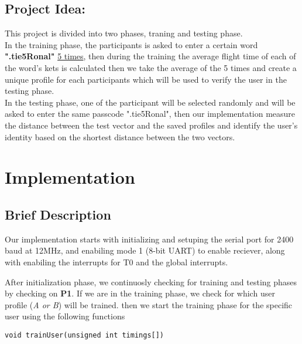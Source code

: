 \documentclass[runningheads]{llncs}
\begin{document}
\subsection{Project Idea:} 
This project is divided into two phases, traning and testing phase. \\

In the training phase, the participants is asked to enter a certain word \textbf{".tie5Ronal"} \underline{5 times}, then during the training the average flight time of each of the word's kets is calculated then we take the average of the 5 times and create a unique profile for each participants which will be used to verify the user in the testing phase. \\

In the testing phase, one of the participant will be selected randomly and will be asked to enter the same passcode ".tie5Ronal", then our implementation measure the distance between the test vector and the saved profiles and identify the user's identity based on the shortest distance between the two vectors. \newline \newline \newline

%
%
%

\section{Implementation}

\subsection{Brief Description}
Our implementation starts with initializing and setuping the serial port for 2400 baud at 12MHz, and enabiling mode 1 (8-bit UART) to enable reciever, along with enabiling the interrupts for T0 and the global interrupts. \newline \newline 

After initialization phase, we continuosly checking for training and testing phases by checking on \textbf{P1}. If we are in the training phase, we check for which user profile (\textit{A or B}) will be trained. then we start the training phase for the specific user using the following functions 

\begin{lstlisting}[style=CStyle]
void trainUser(unsigned int timings[])
\end{lstlisting}
\end{document}
